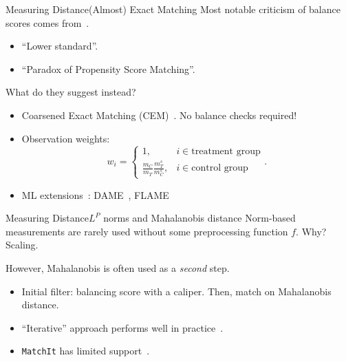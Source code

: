 \documentclass[11pt, compress]{beamer}
\begin{document}
\begin{frame}{Measuring Distance}{(Almost) Exact Matching}
	Most notable criticism of balance scores comes from~\textcite{king_why_2019}.
	\begin{itemize}
		\item ``Lower standard''.
		\item ``Paradox of Propensity Score Matching''.
	\end{itemize}
	What do they suggest instead?
	\begin{itemize}
		\item Coarsened Exact Matching (CEM)~\parencite{iacus_causal_2012}. No balance checks required!
		\item Observation weights:
			\begin{equation}
				w_{i}= \begin{cases}1, & i \in \text{treatment group} \\ \frac{m_{C}}{m_{T}} \frac{m_{T}^{s}}{m_{C}^{s}}, & i \in \text{control group} \end{cases}.
			\end{equation}
		\item ML extensions~\parencite{gupta_dame-flame_2021}: DAME~\parencite{liu_interpretable_2019}, FLAME~\parencite{wang_flame_2021}
	\end{itemize}
\end{frame}

\begin{frame}{Measuring Distance}{$L^P$ norms and Mahalanobis distance}
	Norm-based measurements are rarely used without some preprocessing function $f$.
	Why? Scaling.

	However, Mahalanobis is often used as a \emph{second} step.
	\begin{itemize}
		\item Initial filter: balancing score with a caliper. Then, match on Mahalanobis distance.
		\item ``Iterative'' approach performs well in practice~\parencite{baltar_mahalanobis_2014}. 
		\item \texttt{MatchIt} has limited support~\parencite{ho_matchit_2011}.
	\end{itemize}
\end{frame}
\end{document}
